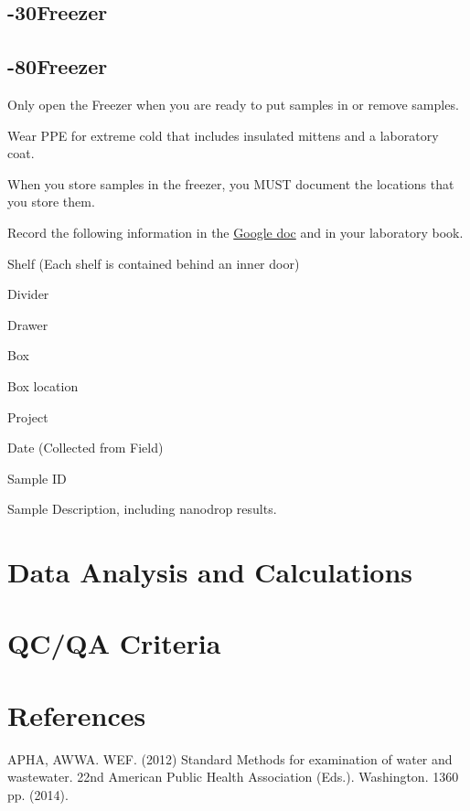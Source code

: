 \documentclass[12pt]{../SOP3_alpha}
\begin{document}
\NP 

\subsection{-30\degree Freezer}

\NP 

\subsection{-80\degree Freezer}

\NP Only open the Freezer when you are ready to put samples in or remove samples. 

\NP Wear PPE for extreme cold that includes insulated mittens and a laboratory coat.

\NP When you store samples in the freezer, you MUST document the locations that you store them. 

\NP Record the following information in the \href{https://docs.google.com/spreadsheets/d/1ohQFRFMBHCu2Wm8H58UH67SJ_uvwSsbRFGZVjZr9Bjc/edit?usp=sharing}{Google doc} and in your laboratory book.

\begin{itemize*}
  \item Shelf (Each shelf is contained behind an inner door)
  \item Divider
  \item Drawer
  \item Box
  \item Box location
  \item Project
  \item Date (Collected from Field)
  \item Sample ID
  \item Sample Description, including nanodrop results.
\end{itemize*}


\section{Data Analysis and Calculations}

\section{QC/QA Criteria}

\section{References}

\NP APHA, AWWA. WEF. (2012) Standard Methods for examination of water and wastewater. 22nd American Public Health Association (Eds.). Washington. 1360 pp. (2014).
\end{document}
